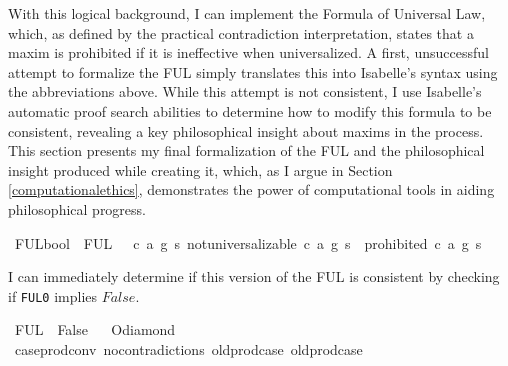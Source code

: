 \begin{isabellebody}
\begin{isamarkuptext}
With this logical background, I can implement the Formula of Universal Law, which, as defined 
by the practical contradiction interpretation, states that a maxim is prohibited if it is ineffective
when universalized. A first, unsuccessful attempt to formalize the FUL simply translates this into Isabelle's syntax
using the abbreviations above. While this attempt is not consistent, I use Isabelle's automatic
proof search abilities to determine how to modify this formula to be consistent, revealing a key philosophical
insight about maxims in the process. This section presents my final formalization of the FUL and the 
philosophical insight produced while creating it, which, as I argue in Section \ref{computationalethics},
demonstrates the power of computational tools in aiding philosophical progress.%
\end{isamarkuptext}\isamarkuptrue%
\isamarkupfalse%
\ FUL{}{\isacharcolon}{\isacharcolon}bool\ \ {\isachardoublequoteopen}FUL{}\ {\isasymequiv}\ {\isasymforall}\ c\ a\ g\ s{\isachardot}\ not{\isacharunderscore}universalizable\ {\isacharparenleft}c{\isacharcomma}\ a{\isacharcomma}\ g{\isacharparenright}\ s\ {\isasymlongrightarrow}\ {\isasymTurnstile}{\isacharparenleft}{\isacharparenleft}prohibited\ {\isacharparenleft}c{\isacharcomma}\ a{\isacharcomma}\ g{\isacharparenright}\ s{\isacharparenright}{\isacharparenright}{\isachardoublequoteclose}\isanewline
%
%
\begin{isamarkuptext}%
I can immediately determine if this version of the FUL is consistent by checking if \texttt{FUL0} 
implies $False$.%
\end{isamarkuptext}\isamarkuptrue%
\isamarkupfalse%
\ {\isachardoublequoteopen}FUL{}\ {\isasymlongrightarrow}\ False{\isachardoublequoteclose}%
\isadelimproof
\ %
\endisadelimproof
%
\isatagproof
{}\isamarkupfalse%
\ O{\isacharunderscore}diamond\isanewline
\ \ \isamarkupfalse%
\ case{\isacharunderscore}prod{\isacharunderscore}conv\ no{\isacharunderscore}contradictions\ old{\isachardot}prod{\isachardot}case\ old{\isachardot}prod{\isachardot}case\ \isamarkupfalse%

\end{isabellebody}
